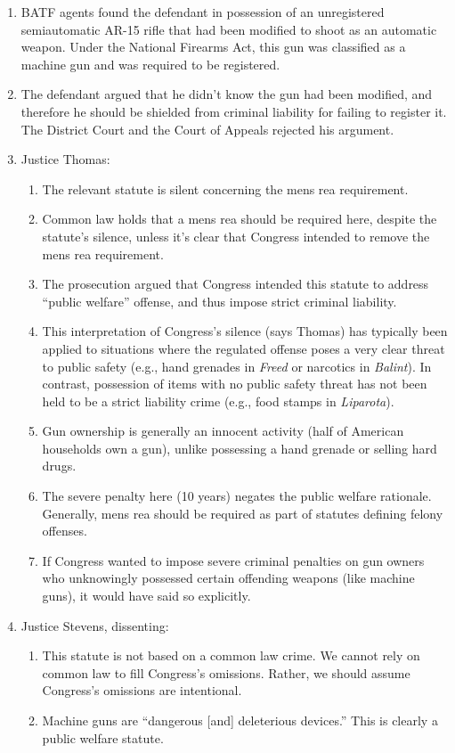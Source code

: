\begin{enumerate}
    \item BATF agents found the defendant in possession of an unregistered 
    semiautomatic AR-15 rifle that had been modified to shoot as an automatic 
    weapon. Under the National Firearms Act, this gun was classified as a 
    machine gun and was required to be registered.
    \item The defendant argued that he didn't know the gun had been modified, 
    and therefore he should be shielded from criminal liability for failing to 
    register it. The District Court and the Court of Appeals rejected his 
    argument.
    \item Justice Thomas:
    \begin{enumerate}
        \item The relevant statute is silent concerning the mens rea 
        requirement.
        \item Common law holds that a mens rea should be required here, 
        despite the statute's silence, unless it's clear that Congress 
        intended to remove the mens rea requirement.
        \item The prosecution argued that Congress intended this statute to 
        address ``public welfare'' offense, and thus impose strict criminal 
        liability.
        \item This interpretation of Congress's silence (says Thomas) has 
        typically been applied to situations where the regulated offense poses 
        a very clear threat to public safety (e.g., hand grenades in 
        \emph{Freed} or narcotics in \emph{Balint}). In contrast, possession 
        of items with no public safety threat has not been held to be a strict 
        liability crime (e.g., food stamps in \emph{Liparota}).
        \item Gun ownership is generally an innocent activity (half of 
        American households own a gun), unlike possessing a hand grenade or 
        selling hard drugs.
        \item The severe penalty here (10 years) negates the public welfare 
        rationale. Generally, mens rea should be required as part of statutes 
        defining felony offenses.
        \item If Congress wanted to impose severe criminal penalties on gun 
        owners who unknowingly possessed certain offending weapons (like 
        machine guns), it would have said so explicitly.
    \end{enumerate}
    \item Justice Stevens, dissenting:
    \begin{enumerate}
        \item This statute is not based on a common law crime. We cannot rely 
        on common law to fill Congress's omissions. Rather, we should assume 
        Congress's omissions are intentional.
        \item Machine guns are ``dangerous [and] deleterious devices.'' This 
        is clearly a public welfare statute.
    \end{enumerate}
\end{enumerate}

